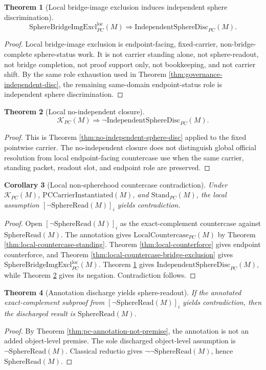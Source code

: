\documentclass[11pt]{article}
\newtheorem{theorem}{Theorem}[section]
\newtheorem{corollary}[theorem]{Corollary}
\newcommand{\StandPC}{\mathrm{Stand}_{PC}}
\newcommand{\SphereRead}{\mathrm{SphereRead}}
\newcommand{\KPC}{\mathcal{K}_{PC}}
\newcommand{\PCCarrierInst}{\mathrm{PCCarrierInstantiated}}
\newcommand{\IndependentSphereDisc}{\mathrm{IndependentSphereDisc}_{PC}}
\newcommand{\SphereBridgeImgExclLoc}{\mathrm{SphereBridgeImgExcl}^{\mathrm{loc}}_{PC}}
\newcommand{\LocalCountercasePC}{\mathrm{LocalCountercase}_{PC}}
\begin{document}
\begin{theorem}[Local bridge-image exclusion induces independent sphere discrimination]\label{thm:local-bridge-exclusion-independent}
\[
\SphereBridgeImgExclLoc(M)\Rightarrow \IndependentSphereDisc(M).
\]
\end{theorem}
\begin{proof}
Local bridge-image exclusion is endpoint-facing, fixed-carrier, non-bridge-complete sphere-status work. It is not carrier standing alone, not sphere-readout, not bridge completion, not proof support only, not bookkeeping, and not carrier shift. By the same role exhaustion used in Theorem \ref{thm:governance-independent-disc}, the remaining same-domain endpoint-status role is independent sphere discrimination.
\end{proof}

\begin{theorem}[Local no-independent closure]\label{thm:local-no-independent}
\[
\KPC(M)\Rightarrow \neg\IndependentSphereDisc(M).
\]
\end{theorem}
\begin{proof}
This is Theorem \ref{thm:no-independent-sphere-disc} applied to the fixed pointwise carrier. The no-independent closure does not distinguish global official resolution from local endpoint-facing countercase use when the same carrier, standing packet, readout slot, and endpoint role are preserved.
\end{proof}

\begin{corollary}[Local non-spherehood countercase contradiction]\label{cor:local-countercase-contradiction}
Under \(\KPC(M)\), \(\PCCarrierInst(M)\), and \(\StandPC(M)\), the local assumption \([\neg\SphereRead(M)]_i\) yields contradiction.
\end{corollary}
\begin{proof}
Open \([\neg\SphereRead(M)]_i\) as the exact-complement countercase against \(\SphereRead(M)\). The annotation gives \(\LocalCountercasePC(M)\) by Theorem \ref{thm:local-countercase-standing}. Theorem \ref{thm:local-counterforce} gives endpoint counterforce, and Theorem \ref{thm:local-countercase-bridge-exclusion} gives \(\SphereBridgeImgExclLoc(M)\). Theorem \ref{thm:local-bridge-exclusion-independent} gives \(\IndependentSphereDisc(M)\), while Theorem \ref{thm:local-no-independent} gives its negation. Contradiction follows.
\end{proof}

\begin{theorem}[Annotation discharge yields sphere-readout]\label{thm:annotation-discharge-sphere-readout}
If the annotated exact-complement subproof from \([\neg\SphereRead(M)]_i\) yields contradiction, then the discharged result is \(\SphereRead(M)\).
\end{theorem}
\begin{proof}
By Theorem \ref{thm:pc-annotation-not-premise}, the annotation is not an added object-level premise. The sole discharged object-level assumption is \(\neg\SphereRead(M)\). Classical reductio gives \(\neg\neg\SphereRead(M)\), hence \(\SphereRead(M)\).
\end{proof}
\end{document}
